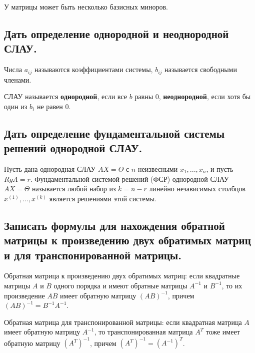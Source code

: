 У матрицы может быть несколько базисных миноров.

\subsection{Дать определение однородной и неоднородной СЛАУ.}


Числа $a_{ij}$ называются коэффициентами системы,
$b_{ij}$ называется свободными членами.

СЛАУ называется {\bf{однородной}}, если все $b$ равны $0$, {\bf{неоднородной}}, если хотя бы один из $b_i$ не равен $0$.

\subsection{Дать определение фундаментальной системы решений однородной СЛАУ.}

Пусть дана однородная СЛАУ $AX = \Theta$ с $n$ неизвесными $x_1, ..., x_n$, и пусть $RgA = r$. Фундаментальной системой решений (ФСР) однородной СЛАУ $AX = \Theta$ называется любой набор из $k = n - r$ линейно независимых столбцов $x^{(1)}, ..., x^{(k)}$ является решениями этой системы.

\subsection{Записать формулы для нахождения обратной матрицы к произведению двух обратимых матриц и для транспонированной матрицы.}

Обратная матрица к произведению двух обратимых матриц: если квадратные матрицы $A$ и $B$ одного порядка и имеют обратные матрицы $A^{-1}$ и $B^{-1}$, то их произведение $AB$ имеет обратную матрицу $(AB)^{-1}$, причем $(AB)^{-1} = B^{-1}A^{-1}$.

\vspace*{15pt}

Обратная матрица для транспонированной матрицы: если квадратная матрица $A$ имеет обратную матрицу $A^{-1}$, то транспонированная матрица $A^T$ тоже имеет обратную матрицу $(A^T)^{-1}$, причем $(A^T)^{-1} = (A^{-1})^T$.

